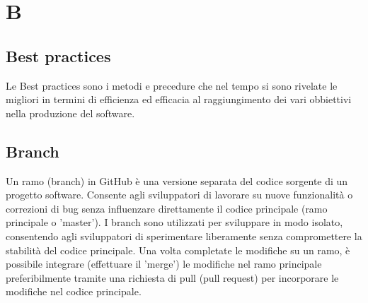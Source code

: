 \section{B} 
\subsection{Best practices} 
Le Best practices sono i metodi e precedure che nel tempo si sono rivelate le migliori in termini di efficienza ed efficacia al raggiungimento dei vari obbiettivi nella produzione del software.
\subsection{Branch} 
Un ramo (branch) in GitHub è una versione separata del codice sorgente di un progetto software. Consente agli sviluppatori di lavorare su nuove funzionalità o correzioni di bug senza influenzare direttamente il codice principale (ramo principale o 'master'). I branch sono utilizzati per sviluppare in modo isolato, consentendo agli sviluppatori di sperimentare liberamente senza compromettere la stabilità del codice principale. Una volta completate le modifiche su un ramo, è possibile integrare (effettuare il 'merge') le modifiche nel ramo principale preferibilmente tramite una richiesta di pull (pull request) per incorporare le modifiche nel codice principale.
